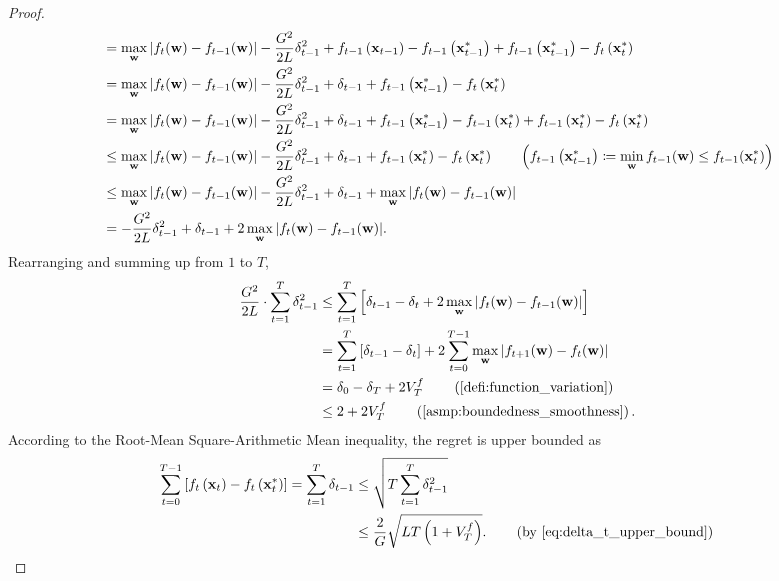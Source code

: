 \begin{proof}
\begin{equation*}
\begin{split}
    &=  \max\limits_{{\mathbf{w}}}{\left| f_{t}({\mathbf{w}}) - f_{t-1}({\mathbf{w}}) \right| } - \frac{G^2}{2L} \delta_{t-1}^2 + f_{t-1}\left({\mathbf{x}}_{t-1}\right) - f_{t-1}\left({\mathbf{x}}_{t-1}^*\right) + f_{t-1}\left({\mathbf{x}}_{t-1}^*\right) - f_t\left( {\mathbf{x}}_t^* \right) \\
    &= \max\limits_{{\mathbf{w}}}{\left| f_{t}({\mathbf{w}}) - f_{t-1}({\mathbf{w}}) \right| } - \frac{G^2}{2L} \delta_{t-1}^2 + \delta_{t-1} + f_{t-1}\left({\mathbf{x}}_{t-1}^*\right) - f_t\left( {\mathbf{x}}_t^* \right) \\
    &= \max\limits_{{\mathbf{w}}}{\left| f_{t}({\mathbf{w}}) - f_{t-1}({\mathbf{w}}) \right| } - \frac{G^2}{2L} \delta_{t-1}^2 + \delta_{t-1} + f_{t-1}\left({\mathbf{x}}_{t-1}^*\right) - f_{t-1}\left({\mathbf{x}}_{t}^*\right) + f_{t-1}\left({\mathbf{x}}_{t}^*\right) - f_t\left( {\mathbf{x}}_t^* \right) \\
    &\le \max\limits_{{\mathbf{w}}}{\left| f_{t}({\mathbf{w}}) - f_{t-1}({\mathbf{w}}) \right| } - \frac{G^2}{2L} \delta_{t-1}^2 + \delta_{t-1} + f_{t-1}\left({\mathbf{x}}_{t}^*\right) - f_t\left( {\mathbf{x}}_t^* \right) \qquad \left(f_{t-1}\left({\mathbf{x}}_{t-1}^*\right) \coloneqq \min\limits_{{\mathbf{w}}}{f_{t-1}({\mathbf{w}})} \le f_{t-1}({\mathbf{x}}_t^*) \right) \\
    &\le \max\limits_{{\mathbf{w}}}{\left| f_{t}({\mathbf{w}}) - f_{t-1}({\mathbf{w}}) \right| } - \frac{G^2}{2L} \delta_{t-1}^2 + \delta_{t-1} + \max\limits_{{\mathbf{w}}}{\left| f_{t}({\mathbf{w}}) - f_{t-1}({\mathbf{w}}) \right| } \\
    &= - \frac{G^2}{2L} \delta_{t-1}^2 + \delta_{t-1} + 2 \max\limits_{{\mathbf{w}}}{\left| f_{t}({\mathbf{w}}) - f_{t-1}({\mathbf{w}}) \right| }.
\end{split}
\end{equation*}
Rearranging and summing up from $1$ to $T$,
\begin{equation}
\label{eq:delta_t_upper_bound}
\begin{split}
    \frac{G^2}{2L} \cdot \sum\limits_{t=1}^{T}{ \delta_{t-1}^2} &\le \sum\limits_{t=1}^{T}{\left[ \delta_{t-1} - \delta_{t} + 2 \max\limits_{\rvw}{\left| f_{t}(\rvw) - f_{t-1}(\rvw) \right|} \right] } \\
    &= \sum\limits_{t=1}^{T}{ \left[ \delta_{t-1} - \delta_{t} \right] } + 2 \sum\limits_{t=0}^{T-1}{ \max\limits_{\rvw}{\left| f_{t+1}(\rvw) - f_{t}(\rvw) \right| } } \\
    &= \delta_0 - \delta_{T} + 2 V_T^f \qquad \left( \text{\cref{defi:function_variation}} \right) \\
    &\le 2 + 2 V_T^f \qquad \left(\text{\cref{asmp:boundedness_smoothness}}\right).
\end{split}
\end{equation}
According to the Root-Mean Square-Arithmetic Mean inequality, the regret is upper bounded as
\begin{equation*}
\begin{split}
    \sum\limits_{t=0}^{T-1}{\left[ f_t\left(\rvx_t\right) - f_t\left( \rvx_t^* \right) \right]} = \sum\limits_{t=1}^{T}{ \delta_{t-1}} &\le \sqrt{T \sum\limits_{t=1}^{T}{ \delta_{t-1}^2}} \\
    &\le \frac{2}{G} \sqrt{L T \left( 1 + V_T^f \right)}. \qquad \left(\text{by \cref{eq:delta_t_upper_bound}}\right) \qedhere
\end{split}
\end{equation*}
\end{proof}